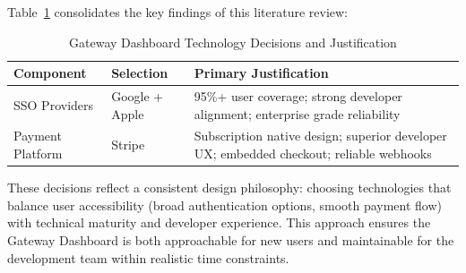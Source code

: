 Table~\ref{tab:technology_summary} consolidates the key findings of this literature review:

\begin{table}[H]
\centering
\caption{Gateway Dashboard Technology Decisions and Justification}
\label{tab:technology_summary}
\begin{tabular}{|l|l|p{5cm}|}
\hline
\textbf{Component} & \textbf{Selection} & \textbf{Primary Justification} \\ \hline
SSO Providers & Google + Apple & 95\%+ user coverage; strong developer alignment; enterprise grade reliability \\ \hline
Payment Platform & Stripe & Subscription native design; superior developer UX; embedded checkout; reliable webhooks \\ \hline
\end{tabular}
\end{table}

These decisions reflect a consistent design philosophy: choosing technologies that balance user accessibility (broad authentication options, smooth payment flow) with technical maturity and developer experience. This approach ensures the Gateway Dashboard is both approachable for new users and maintainable for the development team within realistic time constraints.
